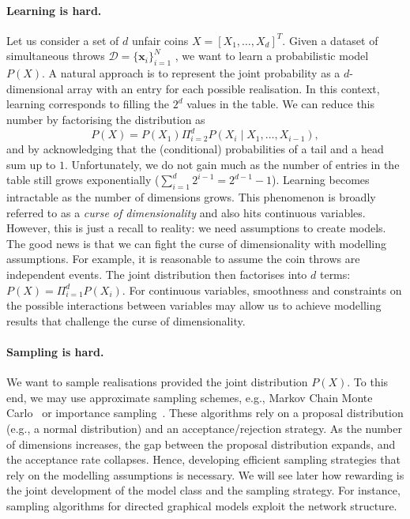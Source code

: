 \paragraph{Learning is hard.} Let us consider a set of $d$ unfair coins $X = \left[X_1, \dots, X_d \right]^T$. Given a dataset of simultaneous throws $\mathcal{D} = \{\bm{x}_i\}_{i=1}^N$ , we want to learn a probabilistic model $P(X)$. A natural approach is to represent the joint probability as a $d$-dimensional array with an entry for each possible realisation. In this context, learning corresponds to filling the $2^d$ values in the table. We can reduce this number by factorising the distribution as
$$P(X) = P(X_1)\Pi_{i=2}^d P(X_i\mid X_1, \dots, X_{i-1}),$$ and by acknowledging that the (conditional) probabilities of a tail and a head sum up to $1$. Unfortunately, we do not gain much as the number of entries in the table still grows exponentially ($\sum_{i=1}^d 2^{i-1} = 2^{d-1} - 1$). Learning becomes intractable as the number of dimensions grows. This phenomenon is broadly referred to as a \textit{curse of dimensionality} and also hits continuous variables. However, this is just a recall to reality: we need assumptions to create models. The good news is that we can fight the curse of dimensionality with modelling assumptions. For example, it is reasonable to assume the coin throws are independent events. The joint distribution then factorises into $d$ terms: $ P(X) = \Pi_{i=1}^d P(X_i)$. For continuous variables, smoothness and constraints on the possible interactions between variables may allow us to achieve modelling results that challenge the curse of dimensionality.

\paragraph{Sampling is hard.} We want to sample realisations provided the joint distribution $P(X)$. To this end, we may use approximate sampling schemes, e.g., Markov Chain Monte Carlo~\citep[][MCMC]{gilks1995markov, geyer1992practical} or importance sampling~\citep{tokdar2010importance}. These algorithms rely on a proposal distribution (e.g., a normal distribution) and an acceptance/rejection strategy. As the number of dimensions increases, the gap between the proposal distribution expands, and the acceptance rate collapses. Hence, developing efficient sampling strategies that rely on the modelling assumptions is necessary. We will see later how rewarding is the joint development of the model class and the sampling strategy. For instance, sampling algorithms for directed graphical models exploit the network structure.


